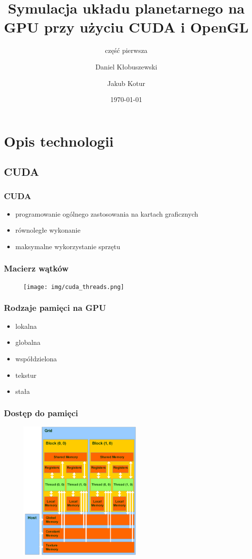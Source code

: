 \documentclass{beamer}
\title{Symulacja układu planetarnego na GPU przy użyciu CUDA i OpenGL}
\subtitle{część pierwsza}
\author{Daniel Kłobuszewski\and Jakub Kotur}
\institute{Politechnika Warszawska}
\date{\today}
\begin{document}
\frame[plain]{\titlepage}


\section{Opis technologii}\label{sec:opis technologii}


\subsection{CUDA}\label{sub:cuda}

\frame
{
	\frametitle{CUDA}
	\begin{itemize}
	\item{programowanie ogólnego zastosowania na kartach graficznych}
	\item{równoległe wykonanie}
	\item{maksymalne wykorzystanie sprzętu}
	\end{itemize}
}

\frame
{
	\frametitle{Macierz wątków}
	\begin{figure}
	\centering
		\texttt{[image: img/cuda\_threads.png]}
	\end{figure}
}

\frame
{
	\frametitle{Rodzaje pamięci na GPU}

	\begin{itemize}
	\item lokalna
		\item globalna
		\item współdzielona
		\item tekstur
		\item stała
		\end{itemize}
}

\frame
{
	\frametitle{Dostęp do pamięci}
	\begin{figure}
	\centering
		\includegraphics[height=7cm]{img/cuda_memory.png}
	\end{figure}
}
\end{document}
